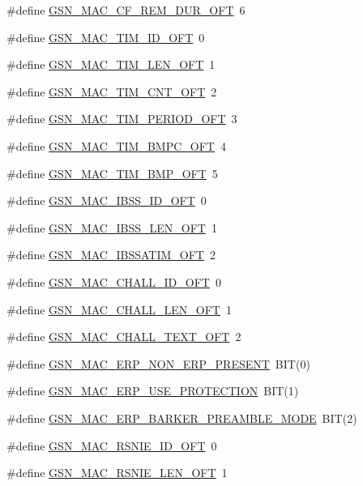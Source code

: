 \begin{DoxyCompactItemize}
\item 
\#define \hyperlink{a00523_a9c409211ed4d2ad4d4c15d9e9fe717c9}{GSN\_\-MAC\_\-CF\_\-REM\_\-DUR\_\-OFT}~6
\item 
\#define \hyperlink{a00523_a98a986eff384d4fbed7a37104023c47f}{GSN\_\-MAC\_\-TIM\_\-ID\_\-OFT}~0
\item 
\#define \hyperlink{a00523_a12a7796e5fd63c3fb196b85dc897671d}{GSN\_\-MAC\_\-TIM\_\-LEN\_\-OFT}~1
\item 
\#define \hyperlink{a00523_a5cda601bb3fc51b443d9a0a9ab34e5bf}{GSN\_\-MAC\_\-TIM\_\-CNT\_\-OFT}~2
\item 
\#define \hyperlink{a00523_a702536e391aefc8f26055b1d47c6fcb3}{GSN\_\-MAC\_\-TIM\_\-PERIOD\_\-OFT}~3
\item 
\#define \hyperlink{a00523_a8b598c336e337983e7c2bee675cefe06}{GSN\_\-MAC\_\-TIM\_\-BMPC\_\-OFT}~4
\item 
\#define \hyperlink{a00523_acb812103c6fa3cdb90b96a443e3a318b}{GSN\_\-MAC\_\-TIM\_\-BMP\_\-OFT}~5
\item 
\#define \hyperlink{a00523_a48110085a66cecc8ed7433f7dab46f1b}{GSN\_\-MAC\_\-IBSS\_\-ID\_\-OFT}~0
\item 
\#define \hyperlink{a00523_a0999c2729afdb30a1bf3f42f7b5cbd4e}{GSN\_\-MAC\_\-IBSS\_\-LEN\_\-OFT}~1
\item 
\#define \hyperlink{a00523_ad5f45d9288f07b00171f1c7208eba9a9}{GSN\_\-MAC\_\-IBSSATIM\_\-OFT}~2
\item 
\#define \hyperlink{a00523_a7bc202a12f40ac60a360325b457480ec}{GSN\_\-MAC\_\-CHALL\_\-ID\_\-OFT}~0
\item 
\#define \hyperlink{a00523_ad6ce1086b682d2f97b0429019bf4f291}{GSN\_\-MAC\_\-CHALL\_\-LEN\_\-OFT}~1
\item 
\#define \hyperlink{a00523_a147de2cdb4bb82451b70648c0b2f5acd}{GSN\_\-MAC\_\-CHALL\_\-TEXT\_\-OFT}~2
\item 
\#define \hyperlink{a00523_a79cf26a78bdeea2cf1672f04d1be749b}{GSN\_\-MAC\_\-ERP\_\-NON\_\-ERP\_\-PRESENT}~BIT(0)
\item 
\#define \hyperlink{a00523_ac713737cf4b06f4dfd02cf779ae1556e}{GSN\_\-MAC\_\-ERP\_\-USE\_\-PROTECTION}~BIT(1)
\item 
\#define \hyperlink{a00523_ac2dc3d7dab46e5b1effe0581d070da22}{GSN\_\-MAC\_\-ERP\_\-BARKER\_\-PREAMBLE\_\-MODE}~BIT(2)
\item 
\#define \hyperlink{a00523_adea512e51ea5790311491642a80775bb}{GSN\_\-MAC\_\-RSNIE\_\-ID\_\-OFT}~0
\item 
\#define \hyperlink{a00523_a42bd2cb33b92c35bb4a2c438d778b08b}{GSN\_\-MAC\_\-RSNIE\_\-LEN\_\-OFT}~1

\end{DoxyCompactItemize}
